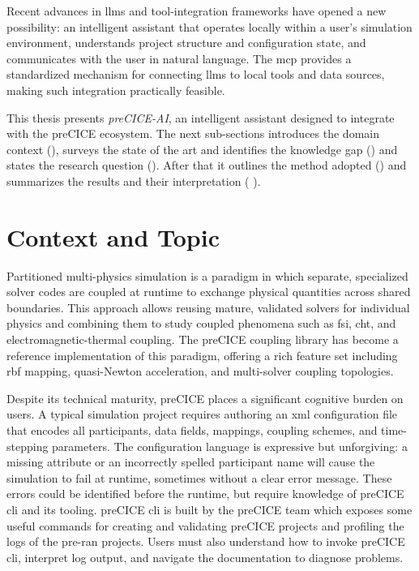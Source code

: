 \documentclass[
  numbers=noenddot,
  english,
  a4paper,
  twoside,
  bibliography=totoc,
  headsepline,
  cleardoublepage=empty,
  parskip=half,
  draft=false
]{scrbook}
\theoremstyle{break}
\renewcommand{\_}{\textunderscore\allowbreak}
\begin{document}
Recent advances in \glspl{llm} and tool-integration frameworks have opened a new possibility:
an intelligent assistant that operates locally within a user's simulation environment,
understands project structure and configuration state, and communicates with the user in
natural language.
The \gls{mcp} \cite{mcp2024spec} provides a standardized mechanism for connecting \glspl{llm}
to local tools and data sources, making such integration practically feasible.

This thesis presents \emph{preCICE-AI}, an intelligent assistant designed to integrate with
the preCICE ecosystem. The next sub-sections introduces the domain context (), 
surveys the state of the art and identifies the knowledge gap () and 
states the research question (). After that it
outlines the method adopted () and summarizes the results and their interpretation ( ).


\section{Context and Topic}\label{sec:introduction:topic}

Partitioned multi-physics simulation is a paradigm in which separate, specialized solver codes
are coupled at runtime to exchange physical quantities across shared boundaries.
This approach allows reusing mature, validated solvers for individual physics and combining them
to study coupled phenomena such as \gls{fsi}, \gls{cht}, and
electromagnetic-thermal coupling.
The preCICE coupling library \cite{chourdakis2022precice} has become a reference
implementation of this paradigm, offering a rich feature set including \gls{rbf} mapping,
quasi-Newton acceleration, and multi-solver coupling topologies.

Despite its technical maturity, preCICE places a significant cognitive burden on users.
A typical simulation project requires authoring an \gls{xml} configuration file that encodes all
participants, data fields, mappings, coupling schemes, and time-stepping parameters.
The configuration language is expressive but unforgiving: a missing attribute or an incorrectly
spelled participant name will cause the simulation to fail at runtime, sometimes without a
clear error message. These errors could be identified before the runtime, but require knowledge of 
preCICE \gls{cli} and its tooling. preCICE \gls{cli} is built by the preCICE team which exposes some 
useful commands for creating and validating preCICE projects and profiling the logs of the 
pre-ran projects. Users must also understand how to invoke preCICE \gls{cli}, interpret log output, and
navigate the documentation to diagnose problems.
\end{document}

